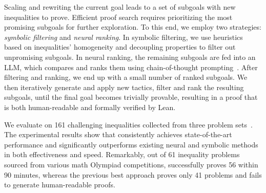Scaling and rewriting the current goal leads to a set of subgoals with new inequalities to prove. Efficient proof search requires prioritizing the most promising subgoals for further exploration. To this end, we employ two strategies: \emph{symbolic filtering} and \emph{neural ranking}. In symbolic filtering, we use heuristics based on inequalities' homogeneity and decoupling properties to filter out unpromising subgoals. In neural ranking, the remaining subgoals are fed into an LLM, which compares and ranks them using chain-of-thought prompting~\citep{wei2022chain}. After filtering and ranking, we end up with a small number of ranked subgoals. We then iteratively generate and apply new tactics, filter and rank the resulting subgoals, until the final goal becomes trivially provable, resulting in a proof that is both human-readable and formally verified by Lean.

We evaluate \name on 161 challenging inequalities collected from three problem sets~\citep{chen2014brief,Tung2012Nice, wei2024proving}. The experimental results show that \name consistently achieves state-of-the-art performance and significantly outperforms existing neural and symbolic methods in both effectiveness and speed.
Remarkably, out of 61 inequality problems sourced from various math Olympiad competitions, \name successfully proves 56 within 90 minutes,
whereas the previous best approach proves only 41 problems and fails to generate human-readable proofs.
